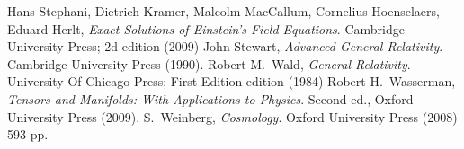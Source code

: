 \begin{thebibliography}{99}
  Hans Stephani, Dietrich Kramer, Malcolm MacCallum, Cornelius Hoenselaers, Eduard Herlt,\newblock
  \emph{Exact Solutions of Einstein's Field Equations}.\newblock
  Cambridge University Press; 2d edition (2009)
  John Stewart,\newblock
  \emph{Advanced General Relativity}.\newblock
  Cambridge University Press (1990).
  Robert M.\ Wald,\newblock
  \emph{General Relativity}.\newblock
  University Of Chicago Press; First Edition edition (1984)
  Robert H.\ Wasserman,\newblock
  \emph{Tensors and Manifolds: With Applications to Physics}.\newblock
  Second ed., Oxford University Press (2009).
  S.~Weinberg,\newblock
  \emph{Cosmology}.\newblock
  Oxford University Press (2008) 593 pp.
\end{thebibliography}


